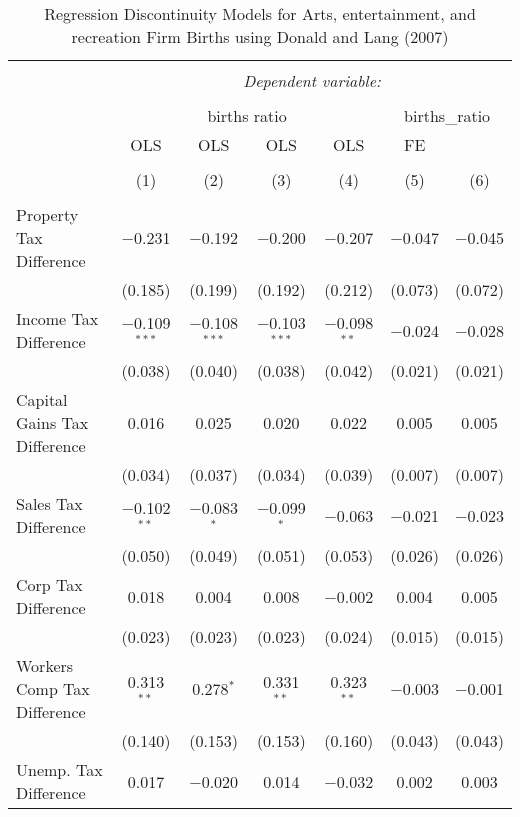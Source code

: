 
\begin{table}[!htbp] \centering 
  \caption{Regression Discontinuity Models for  Arts, entertainment, and recreation Firm Births using Donald and Lang (2007)} 
  \label{} 
\begin{tabular}{@{\extracolsep{5pt}}lcccccc} 
\\[-1.8ex]\hline 
\hline \\[-1.8ex] 
 & \multicolumn{6}{c}{\textit{Dependent variable:}} \\ 
\cline{2-7} 
\\[-1.8ex] & \multicolumn{4}{c}{births ratio} & \multicolumn{2}{c}{births\_ratio} \\ 
 & OLS & OLS & OLS & OLS & FE &  \\ 
\\[-1.8ex] & (1) & (2) & (3) & (4) & (5) & (6)\\ 
\hline \\[-1.8ex] 
 Property Tax Difference & $-$0.231 & $-$0.192 & $-$0.200 & $-$0.207 & $-$0.047 & $-$0.045 \\ 
  & (0.185) & (0.199) & (0.192) & (0.212) & (0.073) & (0.072) \\ 
  Income Tax Difference & $-$0.109$^{***}$ & $-$0.108$^{***}$ & $-$0.103$^{***}$ & $-$0.098$^{**}$ & $-$0.024 & $-$0.028 \\ 
  & (0.038) & (0.040) & (0.038) & (0.042) & (0.021) & (0.021) \\ 
  Capital Gains Tax Difference & 0.016 & 0.025 & 0.020 & 0.022 & 0.005 & 0.005 \\ 
  & (0.034) & (0.037) & (0.034) & (0.039) & (0.007) & (0.007) \\ 
  Sales Tax Difference & $-$0.102$^{**}$ & $-$0.083$^{*}$ & $-$0.099$^{*}$ & $-$0.063 & $-$0.021 & $-$0.023 \\ 
  & (0.050) & (0.049) & (0.051) & (0.053) & (0.026) & (0.026) \\ 
  Corp Tax Difference & 0.018 & 0.004 & 0.008 & $-$0.002 & 0.004 & 0.005 \\ 
  & (0.023) & (0.023) & (0.023) & (0.024) & (0.015) & (0.015) \\ 
  Workers Comp Tax Difference & 0.313$^{**}$ & 0.278$^{*}$ & 0.331$^{**}$ & 0.323$^{**}$ & $-$0.003 & $-$0.001 \\ 
  & (0.140) & (0.153) & (0.153) & (0.160) & (0.043) & (0.043) \\ 
  Unemp. Tax Difference & 0.017 & $-$0.020 & 0.014 & $-$0.032 & 0.002 & 0.003 \\ 

\end{tabular}
\end{table}
